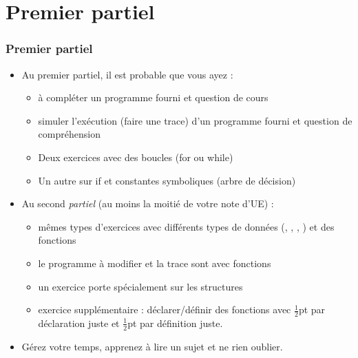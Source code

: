 \documentclass[xcolor=pdftex,svgnames,table]{beamer}
\begin{document}
\section{Premier partiel}
\begin{frame}
  \frametitle{Premier partiel}
  \begin{itemize}
\item Au \alert{premier partiel}, il est probable que vous ayez :
  \begin{itemize}
    \item  à compléter un programme fourni et question de
      cours
    \item simuler l'exécution (faire une trace) 
      d'un programme fourni et question de compréhension
    \item Deux exercices avec des boucles (for
      ou while)
    \item Un autre sur if et constantes symboliques (arbre de décision)\pause
  \end{itemize}

\item Au \alert{second \emph{partiel}} (au moins la moitié de votre note d'UE) :
\begin{itemize}
\item mêmes types d'exercices avec différents types de données (,
  , , )  et des fonctions
\item le programme à modifier et la trace sont avec fonctions
\item un exercice porte spécialement sur les structures
\item exercice supplémentaire : déclarer/définir des fonctions
  avec $\frac{1}{2}$pt  par déclaration juste et $\frac{1}{2}$pt par
  définition juste.\pause
\end{itemize}
    \item
\alert{Gérez votre temps, apprenez à lire un sujet et ne rien oublier.} 
 \end{itemize}
\end{frame}
\end{document}
